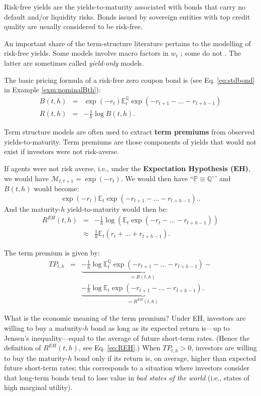 \documentclass[
  12pt,
]{book}
\theoremstyle{definition}
\theoremstyle{definition}
\theoremstyle{definition}
\theoremstyle{definition}
\theoremstyle{remark}
\begin{document}
Risk-free yields are the yields-to-maturity associated with bonds that carry no default and/or liquidity risks. Bonds issued by sovereign entities with top credit quality are usually considered to be risk-free.

An important share of the term-structure literature pertains to the modelling of risk-free yields. Some models involve macro factors in \(w_t\) \citep{Ang_Piazzesi_2003}; some do not \citep{Duffie_Singleton_1997}. The latter are sometimes called \emph{yield-only} models.

The basic pricing formula of a risk-free zero coupon bond is (see Eq. \eqref{eq:stdbond} in Example \ref{exm:nominalBth}):
\begin{eqnarray}
B(t,h) &=& \exp(-r_{t}) \mathbb{E}^{\mathbb{Q}}_t \exp(-r_{t+1}-\dots-r_{t+h-1})\\
R(t,h) &=& - \frac{1}{h} \log B(t,h). \label{eq:stdbondRFchapter}
\end{eqnarray}

Term structure models are often used to extract \textbf{term premiums} from observed yields-to-maturity. Term premiums are those components of yields that would not exist if investors were not risk-averse.

If agents were not risk averse, i.e., under the \textbf{Expectation Hypothesis (EH)}, we would have \(\mathcal{M}_{t,t+1} = \exp(- r_t)\). We would then have ``\(\mathbb{P} \equiv \mathbb{Q}\)'\,' and \(B(t,h)\) would become:
\begin{equation}
\exp(-r_{t}) \mathbb{E}_t \exp(-r_{t+1}-\dots-r_{t+h-1}).\label{eq:stdbondRFchapterP}.
\end{equation}
And the maturity-\(h\) yield-to-maturity would then be:
\begin{eqnarray}
R^{EH}(t,h) &=& -\frac{1}{h}\log \left( \mathbb{E}_t \exp(-r_t-\dots-r_{t+h-1})\right)\nonumber\\
&\approx& \frac{1}{h}\mathbb{E}_t(r_t + \dots + r_{t+h-1}).\label{eq:REH}
\end{eqnarray}

The term premium is given by:
\begin{eqnarray}
TP_{t,h} &=& \underbrace{- \frac{1}{h} \log  \mathbb{E}^{\mathbb{Q}}_t \exp(-r_{t+1}-\dots-r_{t+h-1})}_{=R(t,h)} - \nonumber \\
&& \underbrace{- \frac{1}{h}  \log  \mathbb{E}_t \exp(-r_{t+1}-\dots-r_{t+h-1}).}_{=R^{EH}(t,h)}\label{eq:TP}
\end{eqnarray}

What is the economic meaning of the term premium? Under EH, investors are willing to buy a maturity-\(h\) bond as long as its expected return is---up to Jensen's inequality---equal to the average of future short-term rates. (Hence the definition of \(R^{EH}(t,h)\), see Eq. \eqref{eq:REH}.) When \(TP_{t,h}>0\), investors are willing to buy the maturity-\(h\) bond only if its return is, on average, higher than expected future short-term rates; this corresponds to a situation where investors consider that long-term bonds tend to lose value in \emph{bad states of the world} (i.e., states of high marginal utility).
\end{document}
